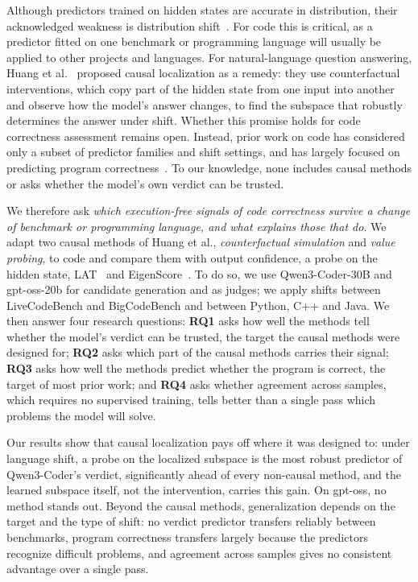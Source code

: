 Although predictors trained on hidden states are accurate in distribution, their
acknowledged weakness is distribution shift~\cite{Kramar2026Probes,
OrgadTGRSKB25}. For code this is critical, as a predictor fitted on one benchmark
or programming language will usually be applied to other projects and languages. For natural-language question answering, Huang et
al.~\cite{Huang2025Internal} proposed causal localization as a remedy: they use
counterfactual interventions, which copy part of the hidden state from one
input into another and observe how the model's answer changes, to find the
subspace that robustly determines the answer %
under shift. Whether this promise holds for code correctness assessment 
remains open. Instead, prior work on code has considered only a subset of predictor families
and shift settings, and has largely focused on predicting program
correctness~\cite{ribeiro2026robustness, he2026codecircuit, huang2025pttrust,
gros2025localized}. To our knowledge, none includes causal methods or asks whether the model's
own verdict can be trusted.

We therefore ask \emph{which execution-free signals of code correctness
survive a change of benchmark or programming language, and what explains those
that do}. We adapt two causal methods of Huang et al., \emph{counterfactual
simulation} and \emph{value probing}, to code and compare them with output
confidence, a probe on the hidden state, LAT~\cite{ribeiro2026repe} and
EigenScore~\cite{Chen24Eigenscore}. To do so, we use Qwen3-Coder-30B and gpt-oss-20b for candidate generation and as judges; we apply shifts between LiveCodeBench and BigCodeBench
and between Python, C++ and Java. We then answer four research questions: \textbf{RQ1} asks how well the methods tell
whether the model's verdict can be trusted, the target the causal methods were
designed for; \textbf{RQ2} asks which part of the causal methods carries their
signal; \textbf{RQ3} asks how well the methods predict whether the program is
correct, the target of most prior work; and \textbf{RQ4} asks whether
agreement across samples, which requires no supervised training, tells better than a single
pass which problems the model will solve. 

Our results show that causal localization pays off where it was designed to:
under language shift, a probe on the localized subspace is the most robust
predictor of Qwen3-Coder's verdict, significantly ahead of every non-causal
method, and the learned subspace itself, not the intervention, carries this
gain. On gpt-oss, no method stands out. Beyond the causal methods,
generalization depends on the target and the type of shift: no verdict
predictor transfers reliably between benchmarks, program correctness
transfers largely because the predictors recognize difficult problems, and
agreement across samples gives no consistent advantage over a single pass.

